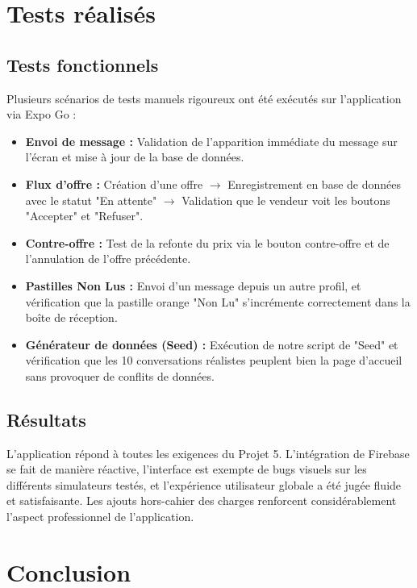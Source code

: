 \documentclass[12pt,a4paper]{report}
\begin{document}
\chapter{Tests réalisés}

\section{Tests fonctionnels}
Plusieurs scénarios de tests manuels rigoureux ont été exécutés sur l'application via Expo Go :
\begin{itemize}
    \item \textbf{Envoi de message :} Validation de l'apparition immédiate du message sur l'écran et mise à jour de la base de données.
    \item \textbf{Flux d'offre :} Création d'une offre $\rightarrow$ Enregistrement en base de données avec le statut "En attente" $\rightarrow$ Validation que le vendeur voit les boutons "Accepter" et "Refuser".
    \item \textbf{Contre-offre :} Test de la refonte du prix via le bouton contre-offre et de l'annulation de l'offre précédente.
    \item \textbf{Pastilles Non Lus :} Envoi d'un message depuis un autre profil, et vérification que la pastille orange "Non Lu" s'incrémente correctement dans la boîte de réception.
    \item \textbf{Générateur de données (Seed) :} Exécution de notre script de "Seed" et vérification que les 10 conversations réalistes peuplent bien la page d'accueil sans provoquer de conflits de données.
\end{itemize}

\section{Résultats}
L'application répond à toutes les exigences du Projet 5. L'intégration de Firebase se fait de manière réactive, l'interface est exempte de bugs visuels sur les différents simulateurs testés, et l'expérience utilisateur globale a été jugée fluide et satisfaisante. Les ajouts hors-cahier des charges renforcent considérablement l'aspect professionnel de l'application.

\chapter*{Conclusion}
\end{document}
